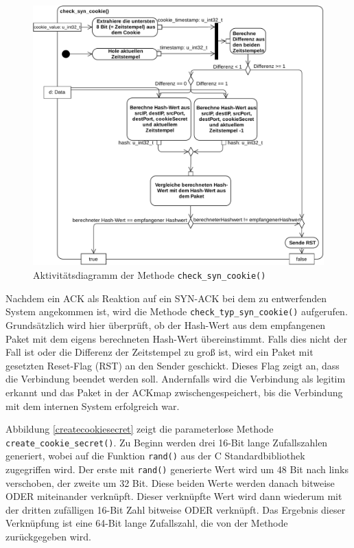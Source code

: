 \documentclass[../review_2.tex]{subfiles}
\begin{document}
\begin{figure}[t]
    \centering
    \includegraphics[width=\linewidth]{img/check_typ_syn_cookie_neu.pdf}
    \caption{Aktivitätsdiagramm der Methode \texttt{check\_syn\_cookie()}}
    \label{check_syn_cookie}
\end{figure}
Nachdem ein ACK als Reaktion auf ein SYN-ACK bei dem zu entwerfenden System angekommen ist, wird die Methode \texttt{check\_typ\_syn\_cookie()} aufgerufen.
Grundsätzlich wird hier überprüft, ob der Hash-Wert aus dem empfangenen Paket mit dem eigens berechneten Hash-Wert übereinstimmt. Falls dies nicht der Fall ist oder die Differenz der Zeitstempel zu groß ist, wird ein Paket mit gesetzten Reset-Flag (RST) an den Sender geschickt. Dieses Flag zeigt an, dass die Verbindung beendet werden soll. Andernfalls wird die Verbindung als legitim erkannt und das Paket in der ACKmap zwischengespeichert, bis die Verbindung mit dem internen System erfolgreich war.

Abbildung \ref{createcookiesecret} zeigt die parameterlose Methode \texttt{create\_cookie\_secret()}. Zu Beginn werden drei 16-Bit lange Zufallszahlen generiert, wobei auf die Funktion \texttt{rand()} aus der C Standardbibliothek zugegriffen wird. Der erste mit \texttt{rand()} generierte Wert wird um 48 Bit nach links verschoben, der zweite um 32 Bit. Diese beiden Werte werden danach bitweise ODER miteinander verknüpft. Dieser verknüpfte Wert wird dann wiederum mit der dritten zufälligen 16-Bit Zahl bitweise ODER verknüpft. Das Ergebnis dieser Verknüpfung ist eine 64-Bit lange Zufallszahl, die von der Methode zurückgegeben wird.
\end{document}
